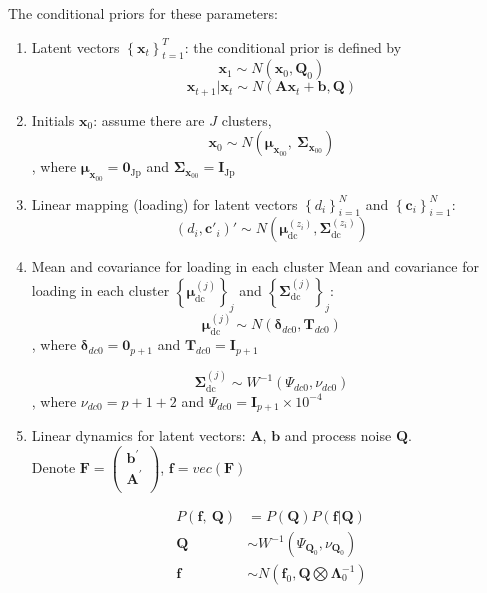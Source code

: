 \documentclass[]{article}
\begin{document}
The conditional priors for these parameters:
\begin{enumerate}
	\def\labelenumi{(\arabic{enumi})}
	\item
	Latent vectors \(\left\{ \mathbf{x}_{t} \right\}_{t=1}^T\): the conditional prior is
	defined by
	\[\mathbf{x}_{1} \sim N(\mathbf{x}_{0},\mathbf{Q}_{0})\]
	\[\mathbf{x}_{t + 1}|\mathbf{x}_{t} \sim N(\mathbf{A}\mathbf{x}_{t} + \mathbf{b},\mathbf{Q})\]
	\item
	Initials \(\mathbf{x}_{0}\): assume there are \(J\) clusters,
	\[\mathbf{x}_{0} \sim N(\bm{\mu}_{\mathbf{x}_{00}},\ \mathbf{\Sigma}_{\mathbf{x}_{00}})\]
	, where \(\bm{\mu}_{\mathbf{x}_{00}} = \mathbf{0}_{\text{Jp}}\) and \(\mathbf{\Sigma}_{\mathbf{x}_{00}} = \mathbf{I}_{\text{Jp}}\)
	\item
	Linear mapping (loading) for latent vectors
	\(\left\{ d_{i} \right\}_{i = 1}^{N}\) and
	\(\left\{ \mathbf{c}_{i} \right\}_{i = 1}^{N}\):
	\[\left( d_{i},\mathbf{c}'_{i} \right)' \sim N(\bm{\mu}_{\text{dc}}^{\left( z_{i} \right)},\mathbf{\Sigma}_{\text{dc}}^{(z_{i})})\]
	\item
	Mean and covariance for loading in each cluster
	Mean and covariance for loading in each cluster
	\(\left\{ \bm{\mu}_{\text{dc}}^{(j)} \right\}_{j}\) and
	\(\left\{ \mathbf{\Sigma}_{\text{dc}}^{(j)} \right\}_{j}\):
	\[\bm{\mu}_{\text{dc}}^{(j)} \sim N(\mathbf{\delta}_{dc0},\mathbf{T}_{dc0})\]
	, where \(\bm{\delta}_{dc0} = \mathbf{0}_{p + 1}\) and
	\(\mathbf{T}_{dc0} = \mathbf{I}_{p + 1}\)
	
	\[\mathbf{\Sigma}_{\text{dc}}^{(j)} \sim W^{- 1}\left( \Psi_{dc0},\nu_{dc0} \right)\]
	, where \(\nu_{dc0} = p + 1 + 2\) and
	\(\Psi_{dc0} = \mathbf{I}_{p + 1} \times 10^{-4}\)
	
	\item
	Linear dynamics for latent vectors: \(\mathbf{A}\), \(\mathbf{b}\) and process noise \(\mathbf{Q}\).\\ 
	Denote \(\mathbf{F} = \begin{pmatrix}
		\mathbf{b}^{'} \\
		\mathbf{A}^{'} \\
	\end{pmatrix}\), \(\mathbf{f} = vec(\mathbf{F})\)
	
	\begin{align*}
		P\left( \mathbf{f},\ \mathbf{Q} \right) &= P(\mathbf{Q})P(\mathbf{f}|\mathbf{Q})\\
		\mathbf{Q} &\sim W^{- 1}(\Psi_{\mathbf{Q}_{0}},\nu_{\mathbf{Q}_{0}})\\
		\mathbf{f} &\sim N(\mathbf{f}_0, \mathbf{Q}\bigotimes \bm{\Lambda}_0^{-1})
	\end{align*}
	

\end{enumerate}
\end{document}
